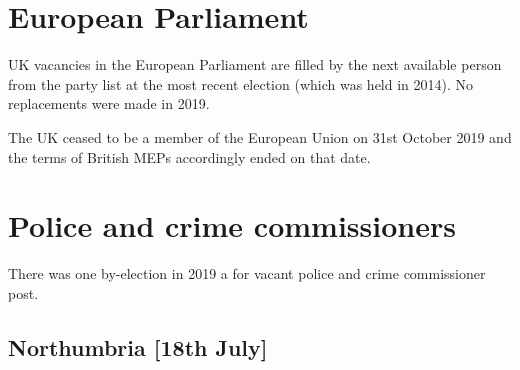 \documentclass[a4paper,openany]{book}
\begin{document}
\section{European Parliament}

UK vacancies in the European Parliament are filled by the next available person from the party list at the most recent election (which was held in 2014). 
No replacements were made in 2019.

The UK ceased to be a member of the European Union on 31st October 2019 and the terms of British MEPs accordingly ended on that date.

\section{Police and crime commissioners}

There was one by-election in 2019 a for vacant police and crime commissioner post.

\subsection*{Northumbria \hspace*{\fill}\nolinebreak[1]%
	\enspace\hspace*{\fill}
	[18th July]}

\end{document}
